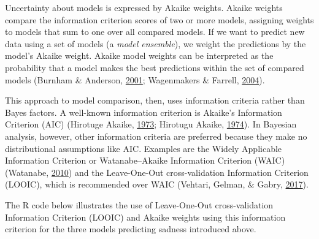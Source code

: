 \documentclass[doc]{apa6}
\begin{document}
Uncertainty about models is expressed by Akaike weights. Akaike weights
compare the information criterion scores of two or more models,
assigning weights to models that sum to one over all compared models. If
we want to predict new data using a set of models (a \emph{model
ensemble}), we weight the predictions by the model's Akaike weight.
Akaike model weights can be interpreted as the probability that a model
makes the best predictions within the set of compared models (Burnham \&
Anderson,
\protect\hyperlink{ref-BurnhamKullbackLeiblerinformationbasis2001}{2001};
Wagenmakers \& Farrell,
\protect\hyperlink{ref-WagenmakersAICmodelselection2004}{2004}).

This approach to model comparison, then, uses information criteria
rather than Bayes factors. A well-known information criterion is
Akaike's Information Criterion (AIC) (Hirotuge Akaike,
\protect\hyperlink{ref-AkaikeInformationtheoryextension1973}{1973};
Hirotugu Akaike,
\protect\hyperlink{ref-akaikeNewLookStatistical1974}{1974}). In Bayesian
analysis, however, other information criteria are preferred because they
make no distributional assumptions like AIC. Examples are the Widely
Applicable Information Criterion or Watanabe--Akaike Information
Criterion (WAIC) (Watanabe,
\protect\hyperlink{ref-WatanabeAsymptoticEquivalenceBayes2010}{2010})
and the Leave-One-Out cross-validation Information Criterion (LOOIC),
which is recommended over WAIC (Vehtari, Gelman, \& Gabry,
\protect\hyperlink{ref-Vehtari2017}{2017}).

The R code below illustrates the use of Leave-One-Out cross-validation
Information Criterion (LOOIC) and Akaike weights using this information
criterion for the three models predicting sadness introduced above.
\end{document}

